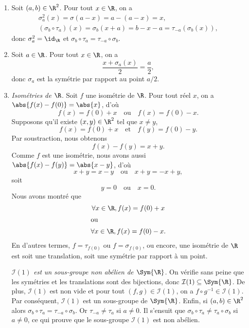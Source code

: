 \begin{enumerate}
  \item %
    Soit $(a,b)\in\R^2$. 
    Pour tout $x\in\R$, on a
    \begin{gather*}
      \sigma_a^2(x) = \sigma(a - x) = a - (a - x) = x, \\
      (\sigma_b\circ \tau_a)(x) = \sigma_b(x + a) = b - x - a = \tau_{-a}(\sigma_b(x)), 
    \end{gather*}
    donc $\sigma_a^2 = \id_\R$ et $\sigma_b\circ \tau_a = \tau_{-a}\circ \sigma_b$.

  \item %
    Soit $a\in\R$.
    Pour tout $x\in\R$, on a
    \[
      \frac{x + \sigma_a(x)}{2} = \frac{a}{2},
    \]
    donc $\sigma_a$ est la symétrie par rapport au point $a/2$.

  \item %
    \emph{Isométries de $\R$.}
    Soit $f$ une isométrie de $\R$.
    Pour tout réel $x$, on a $\abs{f(x) - f(0)} = \abs{x}$, d'où
    \[
      f(x) = f(0) + x \quad\text{ou}\quad f(x) = f(0) - x.
    \]
    Supposons qu'il existe $(x,y)\in\R^2$ tel que $x\neq y$, 
    \[
      f(x) = f(0) + x \quad\text{et}\quad f(y) = f(0) - y.
    \]
    Par soustraction, nous obtenons
    \[
      f(x) - f(y) = x + y.
    \]
    Comme $f$ est une isométrie, nous avons aussi $\abs{f(x) - f(y)} = \abs{x - y}$, d'où
    \[
      x + y = x - y \quad\text{ou}\quad x + y = -x + y,
    \]
    soit
    \[
      y = 0 \quad\text{ou}\quad x = 0.
    \]
    Nous avons montré que 
    \begin{gather*}
      \forall x\in\R, f(x) = f(0) + x \\ 
      \shortintertext{ou}
      \forall x\in\R, f(x) = f(0) - x.
    \end{gather*}
    En d'autres termes, $f = \tau_{f(0)}$ ou $f = \sigma_{f(0)}$, ou encore, une isométrie de $\R$ est soit une translation, soit une symétrie par rapport à un point.

    \emph{$\mathcal{I}(1)$ est un sous-groupe non abélien de $\Sym{\R}$.}
    On vérifie sans peine que les symétries et les translations sont des bijections, donc $\mathcal{I}(1)\subseteq\Sym{\R}$.
    De plus, $\mathcal{I}(1)$ est non vide et pour tout $(f,g)\in\mathcal{I}(1)$, on a $f\circ g^{-1}\in\mathcal{I}(1)$.
    Par conséquent, $\mathcal{I}(1)$ est un sous-groupe de $\Sym{\R}$.
    Enfin, si $(a,b)\in\R^2$ alors $\sigma_b\circ\tau_a = \tau_{-a}\circ\sigma_b$.
    Or $\tau_{-a}\neq \tau_a$ si $a\neq 0$.
    Il s'ensuit que $\sigma_b\circ\tau_a \neq \tau_a\circ\sigma_b$ si $a\neq 0$, ce qui prouve que le sous-groupe $\mathcal{I}(1)$ est non abélien.


\end{enumerate}
